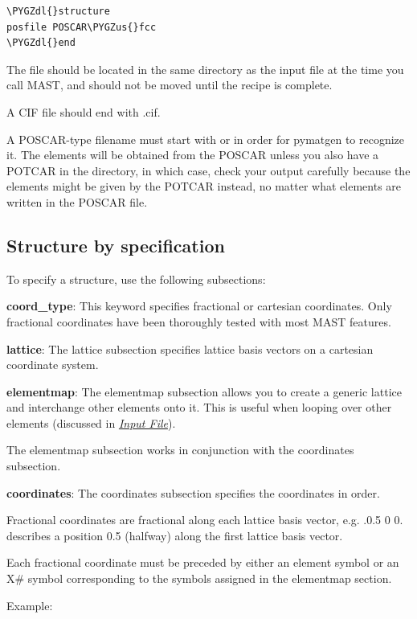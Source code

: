 \documentclass[letterpaper,10pt,english]{sphinxmanual}
\def\PYGZus{\char`\_}
\def\PYGZdl{\char`\$}
\begin{document}
\begin{Verbatim}[commandchars=\\\{\}]
\PYGZdl{}structure
posfile POSCAR\PYGZus{}fcc
\PYGZdl{}end
\end{Verbatim}

The file should be located in the same directory as the input file at the time you call MAST, and should not be moved until the recipe is complete.

A CIF file should end with .cif.

A POSCAR-type filename must start with  or  in order for pymatgen to recognize it. The elements will be obtained from the POSCAR unless you also have a POTCAR in the directory, in which case, check your output carefully because the elements might be given by the POTCAR instead, no matter what elements are written in the POSCAR file.


\subsection{Structure by specification}
\label{3_1_1_structure:structure-by-specification}
To specify a structure, use the following subsections:

\textbf{coord\_type}: This keyword specifies fractional or cartesian coordinates. Only fractional coordinates have been thoroughly tested with most MAST features.

\textbf{lattice}: The lattice subsection specifies lattice basis vectors on a cartesian coordinate system.

\textbf{elementmap}: The elementmap subsection allows you to create a generic lattice and interchange other elements onto it. This is useful when looping over other elements (discussed in {\hyperref[3_0_inputfile::doc]{\emph{Input File}}}).

The elementmap subsection works in conjunction with the coordinates subsection.

\textbf{coordinates}: The coordinates subsection specifies the coordinates in order.

Fractional coordinates are fractional along each lattice basis vector, e.g. .0.5 0 0. describes a position 0.5 (halfway) along the first lattice basis vector.

Each fractional coordinate must be preceded by either an element symbol or an X\# symbol corresponding to the symbols assigned in the elementmap section.

Example:
\end{document}
